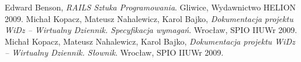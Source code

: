 \documentclass[12pt,leqno,twoside]{mwart}
\begin{document}
\begin{thebibliography}{99}
 Edward Benson, {\it RAILS Sztuka Programowania}. Gliwice, Wydawnictwo HELION 2009.
 Michał Kopacz, Mateusz Nahalewicz, Karol Bajko, {\it Dokumentacja projektu WiDz -- Wirtualny Dziennik. Specyfikacja wymagań}. Wrocław, SPIO IIUWr 2009.
 Michał Kopacz, Mateusz Nahalewicz, Karol Bajko, {\it Dokumentacja projektu WiDz -- Wirtualny Dziennik. Słownik}. Wrocław, SPIO IIUWr 2009.
\end{thebibliography}
\end{document}
